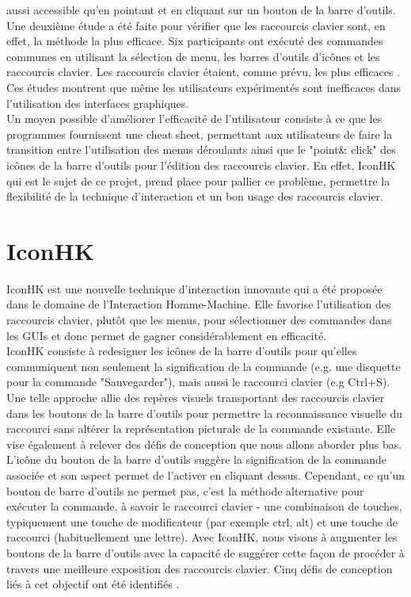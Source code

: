 \documentclass[12pt,a4paper]{article}
\newcommand\tab[1][0.65cm]{\hspace*{#1}}
\begin{document}
aussi accessible qu'en pointant et en cliquant sur un bouton de la barre d’outils.\\
\tab Une deuxième étude a été faite pour vérifier que les raccourcis clavier sont, en effet, la méthode la plus efficace. Six participants ont exécuté des commandes communes en utilisant la sélection de
menu, les barres d'outils d'icônes et les raccourcis clavier. Les raccourcis clavier étaient, comme prévu, les plus efficaces \cite{1}. Ces études montrent que même les utilisateurs expérimentés sont inefficaces dans l'utilisation des interfaces graphiques.\\
\tab Un moyen possible d'améliorer l'efficacité de l'utilisateur consiste à ce que les programmes fournissent une cheat sheet, permettant aux utilisateurs de faire la transition entre l'utilisation des menus déroulants ainsi que le "point\& click" des icônes de la barre d’outils pour l'édition des raccourcis clavier. En effet, IconHK qui est le sujet de ce projet, prend place pour pallier ce problème, permettre la flexibilité de la technique d’interaction et un bon usage des raccourcis clavier.
\section{IconHK}
IconHK est une nouvelle technique d'interaction innovante qui a été proposée dans le domaine de l’Interaction Homme-Machine. Elle favorise l'utilisation des raccourcis clavier, plutôt que les
menus, pour sélectionner des commandes dans les GUIs et donc permet de gagner considérablement en efficacité.\\
\tab IconHK consiste à redesigner les icônes de la barre d'outils pour qu'elles communiquent non seulement la signification de la commande (e.g. une disquette pour la commande "Sauvegarder"), mais aussi le raccourci clavier (e.g Ctrl+S).\\
\tab Une telle approche allie des repères visuels transportant des raccourcis clavier dans les boutons de la barre d’outils pour permettre la reconnaissance visuelle du raccourci sans altérer la représentation
picturale de la commande existante. Elle vise également à relever des défis de conception que nous allons aborder plus bas.\\
\tab L’icône du bouton de la barre d’outils suggère la signification de la commande associée et son aspect permet de l'activer en cliquant dessus. Cependant, ce qu'un bouton de barre d'outils ne permet pas, c’est la méthode alternative pour exécuter la commande, à savoir le raccourci clavier -
une combinaison de touches, typiquement une touche de modificateur (par exemple ctrl, alt) et une touche de raccourci (habituellement une lettre). Avec IconHK, nous visons à augmenter les boutons de la barre d'outils avec la capacité de suggérer cette façon de procéder à travers une meilleure exposition des raccourcis clavier. Cinq défis de conception liés à cet objectif ont été identifiés \cite{3}.
\end{document}
